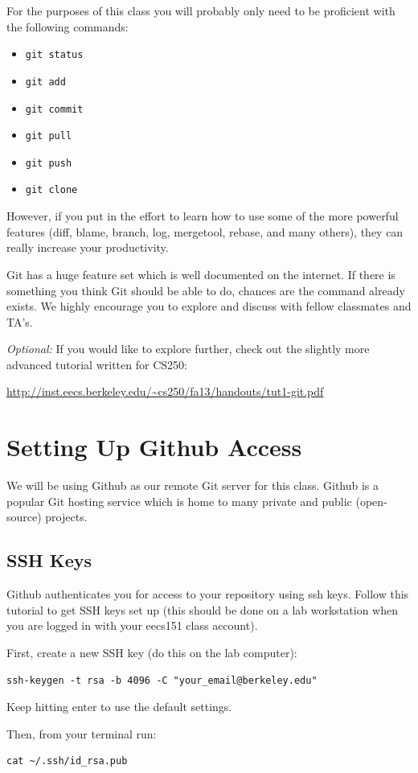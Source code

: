 \documentclass[11pt]{article}
\begin{document}
For the purposes of this class you will probably only need to be proficient with the following commands:
\begin{itemize}
\item {\tt git status}
\item {\tt git add}
\item {\tt git commit}
\item {\tt git pull}
\item {\tt git push}
\item {\tt git clone}
\end{itemize}
However, if you put in the effort to learn how to use some of the more powerful features (diff, blame, branch, log, mergetool, rebase, and many others), they can really increase your productivity.

Git has a huge feature set which is well documented on the internet. If there is something you think Git should be able to do, chances are the command already exists. We highly encourage you to explore and discuss with fellow classmates and TA's.

\textit{Optional:} If you would like to explore further, check out the slightly more advanced tutorial written for CS250:

\url{http://inst.eecs.berkeley.edu/~cs250/fa13/handouts/tut1-git.pdf}

\section{Setting Up Github Access}
We will be using Github as our remote Git server for this class. Github is a popular Git hosting service which is home to many private and public (open-source) projects.

\subsection{SSH Keys}
Github authenticates you for access to your repository using ssh keys. Follow this tutorial to get SSH keys set up (this should be done on a lab workstation when you are logged in with your eecs151 class account).

First, create a new SSH key (do this on the lab computer):
\begin{verbatim}
ssh-keygen -t rsa -b 4096 -C "your_email@berkeley.edu"
\end{verbatim}
Keep hitting enter to use the default settings.

Then, from your terminal run:
\begin{verbatim}
cat ~/.ssh/id_rsa.pub
\end{verbatim}
\end{document}

